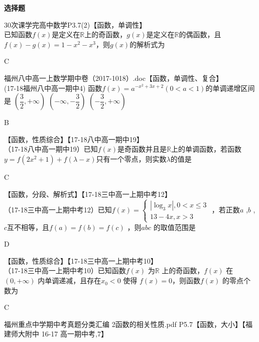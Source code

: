 \begin{exercise}{\bf 选择题}
    \item 30次课学完高中数学P3.7(2)【函数，单调性】\\
      已知函数$f(x)$是定义在$\mathbb{R}$上的奇函数，$g(x)$是定义在$\mathbb{R} $的偶函数，且$f(x)-g(x)=1-x^2-x^3 $，则$g(x) $的解析式为\xz
      \begin{answer}
        C
      \end{answer}
    \item 福州八中高一上数学期中卷（2017-1018）.doc【函数，单调性、复合】\\
      (17-18福州八中高一期中4)
      函数$f(x)=a^{-x^2+3x+2}(0<a<1)$的单调递增区间是\xz
        {$(\dfrac32,+\infty)$}
        {$(-\infty,-\dfrac32)$}
        {$(-\dfrac32,+\infty)$}
      \begin{answer}
        B
      \end{answer}
    \item 【函数，性质综合】【17-18八中高一期中19】\\
      （17-18八中高一期中19）已知$f(x)$是奇函数并且是$\mathbb{R}$上的单调函数，若函数$y=f(2x^2+1)+f(\lambda-x) $只有一个零点，则实数$\lambda $的值是\xz
      \begin{answer}
        C
      \end{answer}
    \item 【函数，分段、解析式】【17-18三中高一上期中考12】\\
      （17-18三中高一上期中考12）已知$f(x)=\begin{cases}
       |\log_3x|,0<x\leq3\\13-4x,x>3
      \end{cases} $ ，若正数$a$ ,$b$ , $c$互不相等，且$f(a)=f(b)=f(c)$ ，则$abc$ 的取值范围是\xz
      \begin{answer}
        D
      \end{answer}
    \item 【函数，性质综合】【17-18三中高一上期中考10】\\
      （17-18三中高一上期中考10）已知函数$f(x)$ 为$\mathbb{R}$ 上的奇函数，$f(x)$ 在$(0,+\infty)$ 内单调递减，且存在$x_0<0$ 使得 $f(x)=0$，则函数$f(x)$ 的零点个数为\xz
      \begin{answer}
        C
      \end{answer}
    \item 福州重点中学期中考真题分类汇编 2函数的相关性质.pdf P5.7【函数，大小】【福建师大附中 16-17 高一期中考,7】\\

\end{exercise}
